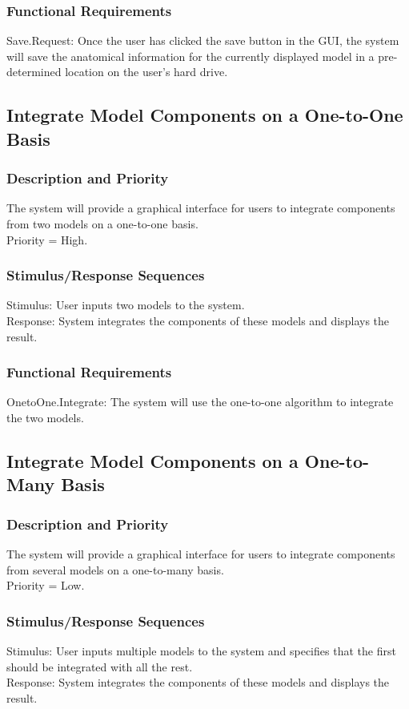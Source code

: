 \documentclass{article}
\begin{document}
\subsubsection{Functional Requirements}
Save.Request: Once the user has clicked the save button in the GUI, the system will save the anatomical information for the currently displayed model in a pre-determined location on the user's hard drive.

\subsection{Integrate Model Components on a One-to-One Basis}
\subsubsection{Description and Priority}
The system will provide a graphical interface for users to integrate components from two models on a one-to-one basis.\\
Priority = High.

\subsubsection{Stimulus/Response Sequences}
Stimulus: User inputs two models to the system.\\
Response: System integrates the components of these models and displays the result.

\subsubsection{Functional Requirements}
OnetoOne.Integrate: The system will use the one-to-one algorithm to integrate the two models.

\subsection{Integrate Model Components on a One-to-Many Basis}
\subsubsection{Description and Priority}
The system will provide a graphical interface for users to integrate components from several models on a one-to-many basis.\\
Priority = Low.

\subsubsection{Stimulus/Response Sequences}
Stimulus: User inputs multiple models to the system and specifies that the first should be integrated with all the rest.\\
Response: System integrates the components of these models and displays the result.
\end{document}
